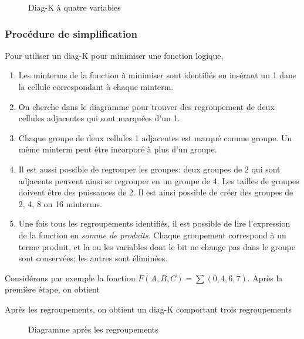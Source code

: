 \documentclass[11pt]{article}
\begin{document}
\begin{figure}[htbp]
\centering

\caption{\label{fig:org87adbb2}Diag-K à quatre variables}
\end{figure}

\subsubsection{Procédure de simplification}
\label{sec:org9a16375}

Pour utiliser un diag-K pour minimiser une fonction logique, 

\begin{enumerate}
\item Les minterms de la fonction à minimiser sont identifiés en insérant
un 1 dans la cellule correspondant à chaque minterm.
\item On cherche dans le diagramme pour trouver des regroupement de deux
cellules adjacentes qui sont marquées d'un 1.
\item Chaque groupe de deux cellules 1 adjacentes est marqué comme
groupe. Un même minterm peut être incorporé à plus d'un groupe.
\item Il est aussi possible de regrouper les groupes: deux groupes de 2
qui sont adjacents peuvent ainsi se regrouper en un groupe
de 4. Les tailles de groupes doivent être des puissances de 2. Il
est ainsi possible de créer des groupes de 2, 4, 8 ou 16 minterms.
\item Une fois tous les regroupements identifiés, il est possible de lire
l'expression de la fonction en \emph{somme de produits}. Chaque groupement
correspond à un terme produit, et la ou les variables dont le bit ne
change pas dans le groupe sont conservées; les autres sont
éliminées.
\end{enumerate}

Considérons par exemple la fonction \(F(A,B,C) = \sum (0, 4, 6,
7)\). Après la première étape, on obtient

\begin{center}

\label{org015c5f3}
\end{center}

Après les regroupements, on obtient un diag-K comportant trois regroupements

\begin{figure}[htbp]
\centering

\caption{\label{fig:org833991c}Diagramme après les regroupements}
\end{figure}
\end{document}

